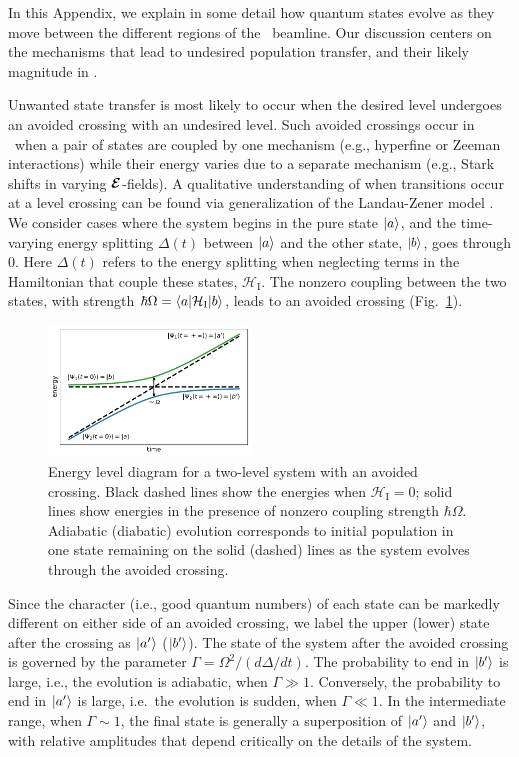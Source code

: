 In this Appendix, we explain in some detail how quantum states evolve as they move between the different regions of the \CENTREX\ beamline.  Our discussion centers on the mechanisms that lead to undesired population transfer, and their likely magnitude in \CENTREX.

Unwanted state transfer is most likely to occur when the desired level undergoes an avoided crossing with an undesired level. Such avoided crossings occur in \CENTREX\ when a pair of states are coupled by one mechanism (e.g., hyperfine or Zeeman interactions) while their energy varies due to a separate mechanism (e.g., Stark shifts in varying $\bm{\mathcal{E}}$-fields). 
A qualitative understanding of when transitions occur at a level crossing can be found via generalization of the Landau-Zener model \cite{wittig_landauzener_2005}.  We consider cases where the system begins in the pure state $|a\rangle$, and the time-varying energy splitting $\Delta(t)$ between $|a\rangle$ and the other state, $|b\rangle$, goes through 0. Here $\Delta(t)$ refers to the energy splitting when neglecting terms in the Hamiltonian that couple these states, $\mathcal{H}_\text{I}$. The nonzero coupling between the two states, with strength $h\hspace*{-0.3em}\bar{}\hspace*{0.25em}\Omega = \langle a|\mathcal{H}_\text{I}|b\rangle $, leads to an avoided crossing (Fig.~\ref{fig:LZ_energy_diagram}).
\begin{figure}
	\centering
	\includegraphics[width=0.48\textwidth,unit=1mm]{figs/matplotlib/lz_energy_diagram.pdf}
	\caption{Energy level diagram for a two-level system with an avoided crossing. Black dashed lines show the energies when $\mathcal{H}_\text{I} = 0$; solid lines show energies in the presence of nonzero coupling strength $\hbar\Omega$. Adiabatic (diabatic) evolution corresponds to initial population in one state remaining on the solid (dashed) lines as the system evolves through the avoided crossing.}
	\label{fig:LZ_energy_diagram}
\end{figure}

Since the character (i.e., good quantum numbers) of each state can be markedly different on either side of an avoided crossing, we label the upper (lower) state after the crossing as $|a'\rangle$ ($|b'\rangle$).  
The state of the system after the avoided crossing is governed by the parameter $\Gamma = \Omega^2/(d\Delta/dt)$. The probability to end in $|b'\rangle$ is large, i.e., the evolution is adiabatic, when $\Gamma \gg 1$. Conversely, the probability to end in $|a'\rangle$ is large, i.e.\ the evolution is sudden, when $\Gamma \ll 1$. In the intermediate range, when $\Gamma\!\sim\! 1$, the final state is generally a superposition of $|a'\rangle$ and $|b'\rangle$, with relative amplitudes that depend critically on the details of the system.

